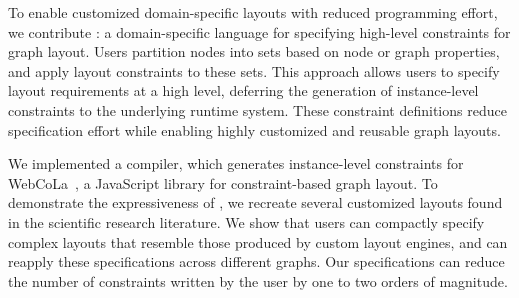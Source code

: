 To enable customized domain-specific layouts with reduced
programming effort, we contribute \projectname: a domain-specific language for
specifying high-level constraints for graph layout. Users partition nodes
into sets based on node or graph properties, and apply layout constraints
to these sets. This approach allows users to specify layout
requirements at a high level, deferring the generation of
instance-level constraints to the underlying runtime system. These constraint
definitions reduce specification effort while enabling highly
customized and reusable graph layouts.

We implemented a \projectname compiler, which generates instance-level 
constraints for WebCoLa~\cite{WebCoLa}, a JavaScript library for constraint-based
graph layout. To demonstrate the expressiveness of \projectname, we
recreate several customized layouts found in the scientific research 
literature. We show that users can compactly specify complex layouts that resemble
those produced by custom layout engines, and can reapply these
specifications across different graphs. Our \projectname specifications
can reduce the number of constraints written by the user by one to two 
orders of magnitude.
